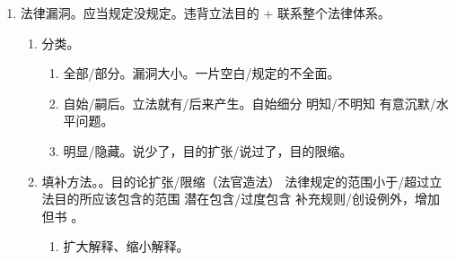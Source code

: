 \begin{enumerate}
\begin{enumerate}
\begin{enumerate}
\begin{enumerate}
                          \item 累计模式。殊途同归。
                          \item 冲突模式。参考排序。文义 \dy 体系 \dy 主观目的 \dy 历史 \dy 比较 \dy 客观目的。
                        \end{enumerate}
                  \item 正式解释/法定解释 \yjt 立法、司法、行政解释。非正式/任意解释 \yjt 学理、论理解释。
                        \begin{enumerate}
                          \item 立法解释（\ydy 法律）。法律本身、明确界限、补充规定 \ydy 变相立法。两央、两高、三委 \yjt 全人常。
                          \item 行政解释。省法规应用问题 \yjt 省政府主管部门。本身 \yjt 省人常。
                          \item 司法解释。备案 + 公布。两央、两高、监省常要求 \yjt 两高。其他提建议。
                        \end{enumerate}
                \end{enumerate}
          \item 法律漏洞。应当规定没规定。违背立法目的 + 联系整个法律体系。
                \begin{enumerate}
                  \item 分类。
                        \begin{enumerate}
                          \item 全部/部分。漏洞大小。一片空白/规定的不全面。
                          \item 自始/嗣后。立法就有/后来产生。自始细分 \yjt 明知/不明知 \yjt 有意沉默/水平问题。
                          \item 明显/隐藏。说少了，目的扩张/说过了，目的限缩。
                        \end{enumerate}
                  \item 填补方法。。目的论扩张/限缩（法官造法） \yjt
                        法律规定的范围小于/超过立法目的所应该包含的范围 \yjt
                        潜在包含/过度包含 \yjt
                        补充规则/创设例外，增加但书 \yjt
                        。
                        \begin{enumerate}
                          \item \bdy 扩大解释、缩小解释。
                        \end{enumerate}
                \end{enumerate}
        \end{enumerate}
\end{enumerate}
